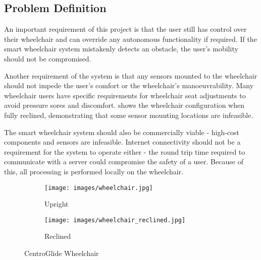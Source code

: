 \pagebreak
\subsection{Problem Definition}
An important requirement of this project is that the user still
has control over their wheelchair and can override any autonomous functionality
if required. If the smart wheelchair system mistakenly detects an obstacle,
the user's mobility should not be compromised.

Another requirement of the system is that any sensors mounted to the wheelchair
should not impede the user's comfort or the wheelchair's manoeuvrability.
Many wheelchair users have specific requirements for wheelchair seat adjustments
to avoid pressure sores and discomfort.  shows the
wheelchair configuration when fully reclined, demonstrating that some sensor mounting locations
are infeasible.

The smart wheelchair system should also be commercially viable - high-cost
components and sensors are infeasible. Internet connectivity should not be a requirement
for the system to operate either - the round trip time required to communicate with a server
could compromise the safety of a user. Because of this, all processing is performed locally
on the wheelchair.

\begin{figure}[b]
    \centering
    \begin{subfigure}{.45\textwidth}
        \centering
        \texttt{[image: images/wheelchair.jpg]}
        \caption{Upright}
    \end{subfigure}
    \quad
    \begin{subfigure}{.45\textwidth}
        \centering
        \texttt{[image: images/wheelchair\_reclined.jpg]}
        \caption{Reclined}
    \end{subfigure}
    \caption{CentroGlide Wheelchair}
    \label{fig:wheelchair}
\end{figure}
